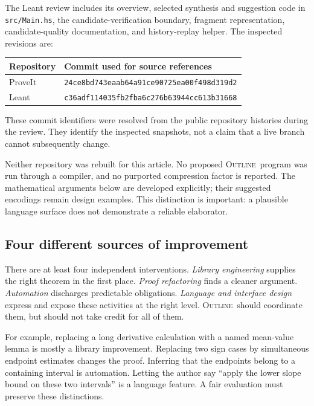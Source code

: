 \documentclass[11pt,a4paper]{article}
\newcommand{\code}[1]{\nolinkurl{#1}}
\newcommand{\Outline}{\textsc{Outline}}
\theoremstyle{definition}
\theoremstyle{remark}
\numberwithin{equation}{section}
\begin{document}
The Leant review includes its overview, selected synthesis and suggestion code in \code{src/Main.hs}, the candidate-verification boundary, fragment representation, candidate-quality documentation, and history-replay helper. The inspected revisions are:
\begin{center}
\begin{tabularx}{\linewidth}{@{}lY@{}}
\toprule
Repository & Commit used for source references \\
\midrule
ProveIt & \code{24ce8bd743eaab64a91ce90725ea00f498d319d2} \\
Leant & \code{c36adf114035fb2fba6c276b63944cc613b31668} \\
\bottomrule
\end{tabularx}
\end{center}
These commit identifiers were resolved from the public repository histories during the review. They identify the inspected snapshots, not a claim that a live branch cannot subsequently change.\cite{p-revision,l-revision}

Neither repository was rebuilt for this article. No proposed \Outline\ program was run through a compiler, and no purported compression factor is reported. The mathematical arguments below are developed explicitly; their suggested encodings remain design examples. This distinction is important: a plausible language surface does not demonstrate a reliable elaborator.

\subsection{Four different sources of improvement}
There are at least four independent interventions. \emph{Library engineering} supplies the right theorem in the first place. \emph{Proof refactoring} finds a cleaner argument. \emph{Automation} discharges predictable obligations. \emph{Language and interface design} express and expose these activities at the right level. \Outline\ should coordinate them, but should not take credit for all of them.

For example, replacing a long derivative calculation with a named mean-value lemma is mostly a library improvement. Replacing two sign cases by simultaneous endpoint estimates changes the proof. Inferring that the endpoints belong to a containing interval is automation. Letting the author say ``apply the lower slope bound on these two intervals'' is a language feature. A fair evaluation must preserve these distinctions.
\end{document}

